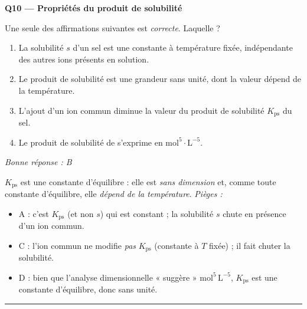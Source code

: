 \documentclass[11pt,a4paper]{article}
\begin{document}
\noindent\textbf{Q10 --- Propriétés du produit de solubilité}\par
Une seule des affirmations suivantes est \emph{correcte}. Laquelle ?
\begin{enumerate}[label=\Alph*)]
\item La solubilité $s$ d'un sel est une constante à température fixée, indépendante des autres ions présents en solution.
\item Le produit de solubilité est une grandeur sans unité, dont la valeur dépend de la température.
\item L'ajout d'un ion commun diminue la valeur du produit de solubilité $K_{\mathrm{ps}}$ du sel.
\item Le produit de solubilité de  s'exprime en $\mathrm{mol^{5}\cdot L^{-5}}$.
\end{enumerate}
\textit{Bonne réponse : B}\par
$K_{\mathrm{ps}}$ est une constante d'équilibre : elle est \emph{sans dimension} et, comme toute constante
d'équilibre, elle \emph{dépend de la température}.
\textit{Pièges :}
\begin{itemize}
\item A : c'est $K_{\mathrm{ps}}$ (et non $s$) qui est constant ; la solubilité $s$ chute en présence d'un ion commun.
\item C : l'ion commun ne modifie \emph{pas} $K_{\mathrm{ps}}$ (constante à $T$ fixée) ; il fait chuter la solubilité.
\item D : bien que l'analyse dimensionnelle « suggère » $\mathrm{mol^{5}\,L^{-5}}$, $K_{\mathrm{ps}}$ est une constante d'équilibre, donc sans unité.
\end{itemize}
\vspace{6pt}\hrule
\end{document}
